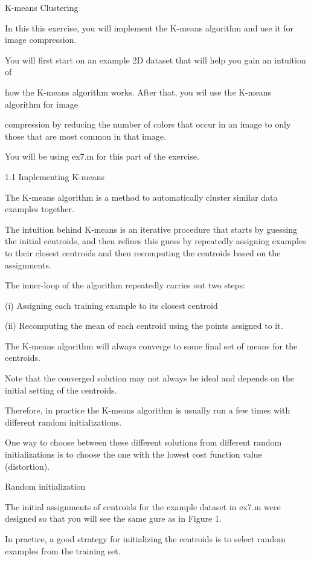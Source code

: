 
K-means Clustering


In this this exercise, you will implement the K-means algorithm and use it for image compression.


You will first start on an example 2D dataset that will help you gain an intuition of

how the K-means algorithm works. After that, you wil use the K-means algorithm for image

compression by reducing the number of colors that occur in an image to only those that are most common in that image.


You will be using ex7.m for this part of the exercise.


1.1 Implementing K-means


The K-means algorithm is a method to automatically cluster similar data examples together.


The intuition behind K-means is an iterative procedure that starts by guessing the initial centroids, and then refines this guess by repeatedly assigning examples to their closest centroids and then recomputing the centroids based on the assignments.


The inner-loop of the algorithm repeatedly carries out two steps: 


(i) Assigning each training example to its closest centroid 

(ii) Recomputing the mean of each centroid using the points assigned to it. 


The K-means algorithm will always converge to some final set of means for the centroids.

Note that the converged solution may not always be ideal and depends on the initial setting of the centroids. 


Therefore, in practice the K-means algorithm is usually run a few times with different random initializations. 


One way to choose between these different solutions from different random initializations is to choose the one with the lowest cost function value (distortion).


Random initialization

The initial assignments of centroids for the example dataset in ex7.m were designed so that you will see the same gure as in Figure 1. 


In practice, a good strategy for initializing the centroids is to select random examples from the training set.

